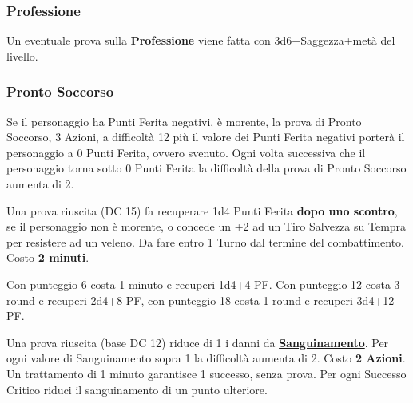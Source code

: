\begin{multicols}{2}
\titlespacing*{\subsubsection}{0pt}{0.5em}{0.5em}\subsubsection*{Professione}
Un eventuale prova sulla \textbf{Professione} viene fatta con 3d6+Saggezza+metà del livello.


\titlespacing*{\subsubsection}{0pt}{0.5em}{0.5em}\subsubsection*{Pronto Soccorso}\hypertarget{prontosoccorso}{}\label{prontosoccorso}

Se il personaggio ha Punti Ferita negativi, è morente, la prova di Pronto Soccorso, 3 Azioni, a difficoltà 12 più il valore dei Punti Ferita negativi porterà il personaggio a 0 Punti Ferita, ovvero svenuto. Ogni volta successiva che il personaggio torna sotto 0 Punti Ferita la difficoltà della prova di Pronto Soccorso aumenta di 2.

Una prova riuscita (DC 15) fa recuperare 1d4 Punti Ferita \textbf{dopo uno scontro}, se il personaggio non è morente, o concede un +2 ad un Tiro Salvezza su Tempra per resistere ad un veleno. Da fare entro 1 Turno dal termine del combattimento. Costo \textbf{2 minuti}.

Con punteggio 6 costa 1 minuto e recuperi 1d4+4 PF. Con punteggio 12 costa 3 round e recuperi 2d4+8 PF, con punteggio 18 costa 1 round e recuperi 3d4+12 PF.

Una prova riuscita (base DC 12) riduce di 1 i danni da \hyperlink{sanguinamento}{\textbf{Sanguinamento}}. Per ogni valore di Sanguinamento sopra 1 la difficoltà aumenta di 2. Costo \textbf{2 Azioni}. Un trattamento di 1 minuto garantisce 1 successo, senza prova. Per ogni Successo Critico riduci il sanguinamento di un punto ulteriore.


\end{multicols}
